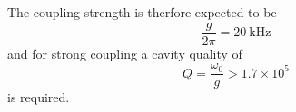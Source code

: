 The coupling strength is therfore expected to be
%
\begin{equation}
  \frac{g}{2\pi} = \SI{20}{\kilo\hertz}
\end{equation}
%
and for strong coupling a cavity quality of
%
\begin{equation}
  Q = \frac{\omega_0}{g} > 1.7 \times 10^5
\end{equation}
%
is required.
